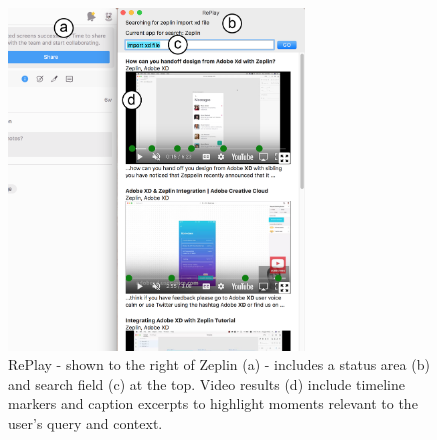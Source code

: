 \begin{figure}[b!]
\centering
  \includegraphics[width=0.7\textwidth]{replay/figures/replay-interface.png}
  \caption{RePlay - shown to the right of Zeplin (a) - includes a status area (b) and search field (c) at the top. Video results (d) include timeline markers and caption excerpts to highlight moments relevant to the user's query and context.}
  \label{fig:replay-interface}
\end{figure}









